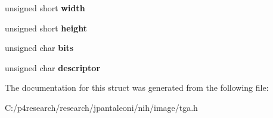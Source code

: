 \begin{DoxyCompactItemize}
\item 
\hypertarget{structnih_1_1_t_g_a_header_ae261168d8904db36be4e1acf3498a040}{
unsigned short {\bfseries width}}
\label{structnih_1_1_t_g_a_header_ae261168d8904db36be4e1acf3498a040}

\item 
\hypertarget{structnih_1_1_t_g_a_header_ab8bd1d1e1917c727c92cfedf641b8edb}{
unsigned short {\bfseries height}}
\label{structnih_1_1_t_g_a_header_ab8bd1d1e1917c727c92cfedf641b8edb}

\item 
\hypertarget{structnih_1_1_t_g_a_header_ada0456b3d727e40e5165a18d7777a7a2}{
unsigned char {\bfseries bits}}
\label{structnih_1_1_t_g_a_header_ada0456b3d727e40e5165a18d7777a7a2}

\item 
\hypertarget{structnih_1_1_t_g_a_header_a5da0e5e8a4f77aeaec715d9749cd422e}{
unsigned char {\bfseries descriptor}}
\label{structnih_1_1_t_g_a_header_a5da0e5e8a4f77aeaec715d9749cd422e}

\end{DoxyCompactItemize}


\-The documentation for this struct was generated from the following file\-:\begin{DoxyCompactItemize}
\item 
\-C\-:/p4research/research/jpantaleoni/nih/image/tga.\-h\end{DoxyCompactItemize}
